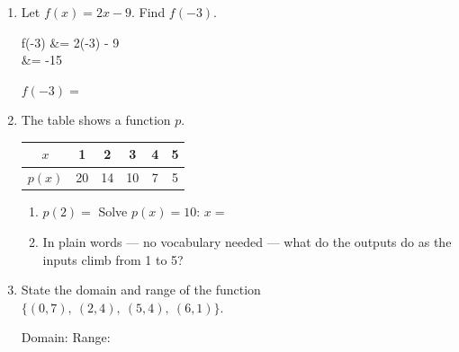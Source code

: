 \documentclass[10pt]{article}
\begin{document}

\vspace{0.12in}

\begin{enumerate}[itemsep=12pt]

\item Let $f(x) = 2x - 9$. Find $f(-3)$.

\begin{work}
  f(-3) &= 2(-3) - 9 \\
        &= -15
\end{work}

$f(-3) = $ \blank{2cm}

\item The table shows a function $p$.

\smallskip
\renewcommand{\arraystretch}{1.4}
\begin{tabular}{|c|c|c|c|c|c|}
\hline
$x$ & 1 & 2 & 3 & 4 & 5 \\
\hline
$p(x)$ & 20 & 14 & 10 & 7 & 5 \\
\hline
\end{tabular}
\smallskip

\begin{enumerate}[label=(\alph*), itemsep=6pt]
  \item $p(2) = $ \blank{1.6cm} \qquad Solve $p(x) = 10$: \quad $x = $ \blank{1.6cm}
  \item In plain words --- no vocabulary needed --- what do the outputs do as
        the inputs climb from 1 to 5?

        \vspace{0.05in}
        \writeline
\end{enumerate}

\item State the domain and range of the function
      $\{(0, 7),\ (2, 4),\ (5, 4),\ (6, 1)\}$.

\vspace{0.05in}
Domain: \blank{4cm} \qquad Range: \blank{4cm}

\end{enumerate}
\end{document}
